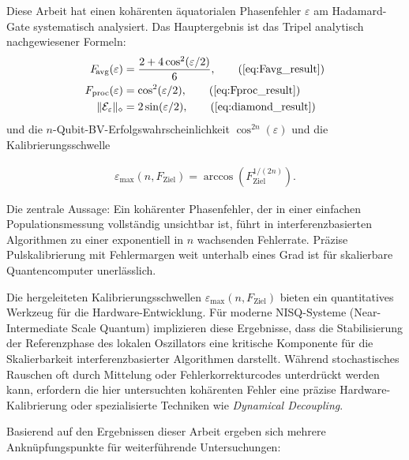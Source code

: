 ﻿\documentclass[11pt,a4paper]{article}
\theoremstyle{definition}
\newcommand{\eps}{\varepsilon}
\newcommand{\Fav}{F_{\!\mathrm{avg}}}
\newcommand{\Fdiam}{\|\mathcal{E}_\eps\|_\diamond}
\begin{document}
Diese Arbeit hat einen kohärenten äquatorialen Phasenfehler $\eps$ am
Hadamard-Gate systematisch analysiert.  Das Hauptergebnis ist das Tripel
analytisch nachgewiesener Formeln:
\begin{align}
  \Fav(\eps) &= \frac{2 + 4\cos^2(\eps/2)}{6}, \tag{\ref{eq:Favg_result}}\\
  F_{\mathrm{proc}}(\eps) &= \cos^2(\eps/2), \tag{\ref{eq:Fproc_result}}\\
  \Fdiam &= 2\sin(\eps/2), \tag{\ref{eq:diamond_result}}
\end{align}
und die $n$-Qubit-BV-Erfolgswahrscheinlichkeit $\cos^{2n}(\eps)$ und die
Kalibrierungsschwelle 

\begin{align}
  \eps_{\max}(n, F_{\mathrm{Ziel}}) = \arccos(F_{\mathrm{Ziel}}^{1/(2n)}).
\end{align}

Die zentrale Aussage: Ein kohärenter Phasenfehler, der in einer einfachen
Populationsmessung vollständig unsichtbar ist, führt in interferenzbasierten
Algorithmen zu einer exponentiell in $n$ wachsenden Fehlerrate.
Präzise Pulskalibrierung mit Fehlermargen weit unterhalb eines Grad ist für
skalierbare Quantencomputer unerlässlich.

Die hergeleiteten Kalibrierungsschwellen $\eps_{\max}(n, F_{\mathrm{Ziel}})$ bieten ein quantitatives Werkzeug für die Hardware-Entwicklung. Für moderne NISQ-Systeme (Near-Intermediate Scale Quantum) implizieren diese Ergebnisse, dass die Stabilisierung der Referenzphase des lokalen Oszillators eine kritische Komponente für die Skalierbarkeit interferenzbasierter Algorithmen darstellt. Während stochastisches Rauschen oft durch Mittelung oder Fehlerkorrekturcodes unterdrückt werden kann, erfordern die hier untersuchten kohärenten Fehler eine präzise Hardware-Kalibrierung oder spezialisierte Techniken wie \emph{Dynamical Decoupling}.

Basierend auf den Ergebnissen dieser Arbeit ergeben sich mehrere Anknüpfungspunkte für weiterführende Untersuchungen:
\end{document}
